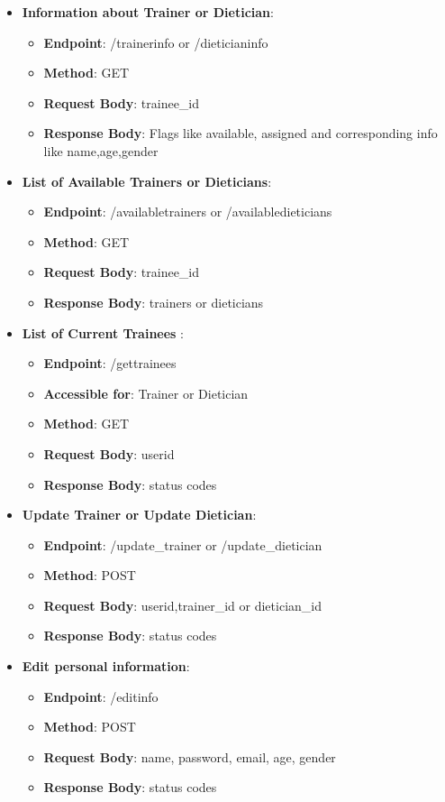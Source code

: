 \documentclass{article}
\begin{document}
\begin{itemize}
\item \textbf{Information about Trainer or Dietician}:
\begin{itemize}
\item \textbf{Endpoint}: /trainerinfo or /dieticianinfo
\item \textbf{Method}: GET
\item \textbf{Request Body}: {trainee\_id}
\item \textbf{Response Body}: {Flags like available, assigned and corresponding info like name,age,gender}
\end{itemize}

\item \textbf{List of Available Trainers or Dieticians}:
\begin{itemize}
\item \textbf{Endpoint}: /availabletrainers or /availabledieticians
\item \textbf{Method}: GET
\item \textbf{Request Body}: {trainee\_id}
\item \textbf{Response Body}: {trainers or dieticians}
\end{itemize}

\item \textbf{List of Current Trainees }:
\begin{itemize}
\item \textbf{Endpoint}: /gettrainees
\item \textbf{Accessible for}: Trainer or Dietician
\item \textbf{Method}: GET
\item \textbf{Request Body}: {userid}
\item \textbf{Response Body}: {status codes}
\end{itemize}


\item \textbf{Update Trainer or Update Dietician}:
\begin{itemize}
\item \textbf{Endpoint}: /update\_trainer or /update\_dietician
\item \textbf{Method}: POST
\item \textbf{Request Body}: {userid,trainer\_id or dietician\_id}
\item \textbf{Response Body}: {status codes}
\end{itemize}

\item \textbf{Edit personal information}:
\begin{itemize}
\item \textbf{Endpoint}: /editinfo
\item \textbf{Method}: POST
\item \textbf{Request Body}: {name, password, email, age, gender}
\item \textbf{Response Body}: {status codes}
\end{itemize}



\end{itemize}
\end{document}
